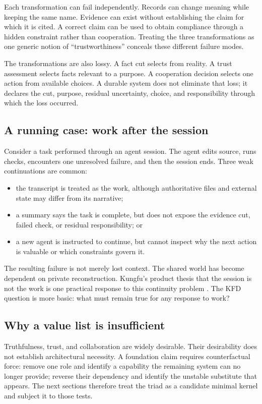 Each transformation can fail independently. Records can change meaning while
keeping the same name. Evidence can exist without establishing the claim for
which it is cited. A correct claim can be used to obtain compliance through a
hidden constraint rather than cooperation. Treating the three transformations
as one generic notion of ``trustworthiness'' conceals these different failure
modes.

The transformations are also lossy. A fact cut selects from reality. A trust
assessment selects facts relevant to a purpose. A cooperation decision
selects one action from available choices. A durable system does not eliminate
that loss; it declares the cut, purpose, residual uncertainty, choice, and
responsibility through which the loss occurred.

\subsection{A running case: work after the session}

Consider a task performed through an agent session. The agent edits source,
runs checks, encounters one unresolved failure, and then the session ends.
Three weak continuations are common:

\begin{itemize}[leftmargin=*]
  \item the transcript is treated as the work, although authoritative files
        and external state may differ from its narrative;
  \item a summary says the task is complete, but does not expose the evidence
        cut, failed check, or residual responsibility; or
  \item a new agent is instructed to continue, but cannot inspect why the next
        action is valuable or which constraints govern it.
\end{itemize}

The resulting failure is not merely lost context. The shared world has become
dependent on private reconstruction. Kungfu's product thesis that the session
is not the work is one practical response to this continuity problem
\cite{kungfuWhitePaper2026}. The KFD question is more basic: what must remain
true for any response to work?

\subsection{Why a value list is insufficient}

Truthfulness, trust, and collaboration are widely desirable. Their desirability
does not establish architectural necessity. A foundation claim requires
counterfactual force: remove one role and identify a capability the remaining
system can no longer provide; reverse their dependency and identify the
unstable substitute that appears. The next sections therefore treat the triad
as a candidate minimal kernel and subject it to those tests.

